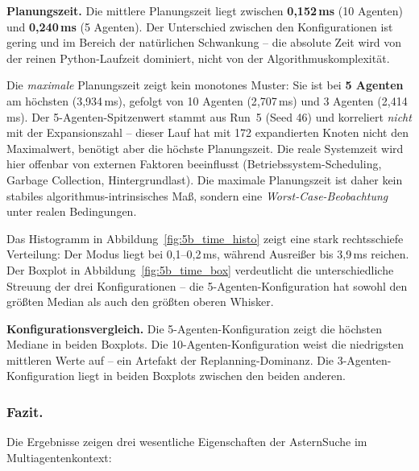 \textbf{Planungszeit.} Die mittlere Planungszeit liegt zwischen \textbf{0{,}152\,ms} (10 Agenten) und \textbf{0{,}240\,ms} (5 Agenten). Der Unterschied zwischen den Konfigurationen ist gering und im Bereich der natürlichen Schwankung -- die absolute Zeit wird von der reinen Python-Laufzeit dominiert, nicht von der Algorithmuskomplexität.

Die \textit{maximale} Planungszeit zeigt kein monotones Muster: Sie ist bei \textbf{5 Agenten} am höchsten (3{,}934\,ms), gefolgt von 10 Agenten (2{,}707\,ms) und 3 Agenten (2{,}414\,ms). Der 5-Agenten-Spitzenwert stammt aus Run~5 (Seed 46) und korreliert \textit{nicht} mit der Expansionszahl -- dieser Lauf hat mit 172 expandierten Knoten nicht den Maximalwert, benötigt aber die höchste Planungszeit. Die reale Systemzeit wird hier offenbar von externen Faktoren beeinflusst (Betriebssystem-Scheduling, Garbage Collection, Hintergrundlast). Die maximale Planungszeit ist daher kein stabiles algorithmus-intrinsisches Maß, sondern eine \textit{Worst-Case-Beobachtung} unter realen Bedingungen.

Das Histogramm in Abbildung~\ref{fig:5b_time_histo} zeigt eine stark rechtsschiefe Verteilung: Der Modus liegt bei 0{,}1--0{,}2\,ms, während Ausreißer bis 3{,}9\,ms reichen. Der Boxplot in Abbildung~\ref{fig:5b_time_box} verdeutlicht die unterschiedliche Streuung der drei Konfigurationen -- die 5-Agenten-Konfiguration hat sowohl den größten Median als auch den größten oberen Whisker.

\textbf{Konfigurationsvergleich.} Die 5-Agenten-Konfiguration zeigt die höchsten Mediane in beiden Boxplots. Die 10-Agenten-Konfiguration weist die niedrigsten mittleren Werte auf -- ein Artefakt der Replanning-Dominanz. Die 3-Agenten-Konfiguration liegt in beiden Boxplots zwischen den beiden anderen.

\subsubsection{Fazit.}

Die Ergebnisse zeigen drei wesentliche Eigenschaften der \acs{Astern}Suche im Multiagentenkontext:

